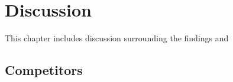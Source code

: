 \chapter{Discussion}
This chapter includes discussion surrounding the findings and 
\section{Competitors}

\section{}